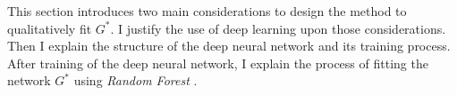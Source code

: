 This section introduces two main considerations to design the method to qualitatively fit $G^*$.
I justify the use of deep learning upon those considerations.
Then I explain the structure of the deep neural network and its training process.
After training of the deep neural network, I explain the process of fitting the network $G^*$ using \textit{Random Forest} \citep{rf, genie3}.
 
 

